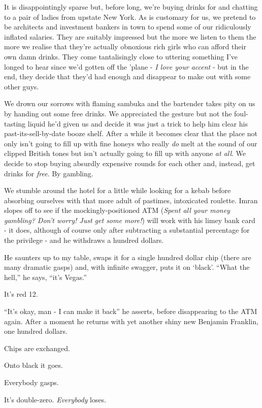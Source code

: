 \documentclass[a5paper,titlepage,11pt,draft]{book}
\begin{document}
It is disappointingly sparse but, before long, we're buying drinks for and chatting to a pair of ladies from upstate New York.  As is customary for us, we pretend to be architects and investment bankers in town to spend some of our ridiculously inflated salaries.  They are suitably impressed but the more we listen to them the more we realise that they're actually obnoxious rich girls who can afford their own damn drinks.  They come tantalisingly close to uttering something I've longed to hear since we'd gotten off the 'plane - \emph{I love your accent} - but in the end, they decide that they'd had enough and disappear to make out with some other guys.

We drown our sorrows with flaming sambuka and the bartender takes pity on us by handing out some free drinks.  We appreciated the gesture but not the foul-tasting liquid he'd given us and decide it was just a trick to help him clear his past-its-sell-by-date booze shelf.  After a while it becomes clear that the place not only isn't going to fill up with fine honeys who really \emph{do} melt at the sound of our clipped British tones but isn't actually going to fill up with anyone \emph{at all}.  We decide to stop buying absurdly expensive rounds for each other and, instead, get drinks for \emph{free}.  By gambling.

We stumble around the hotel for a little while looking for a kebab before absorbing ourselves with that more adult of pastimes, intoxicated roulette.  Imran slopes off to see if the mockingly-positioned ATM (\emph{Spent all your money gambling?  Don't worry!  Just get some more!}) will work with his limey bank card - it does, although of course only after subtracting a substantial percentage for the privilege - and he withdraws a hundred dollars.

He saunters up to my table, swaps it for a single hundred dollar chip (there are many dramatic gasps) and, with infinite swagger, puts it on `black'.  ``What the hell,'' he says, ``it's Vegas.''

It's red 12.

``It's okay, man - I can make it back'' he asserts, before disappearing to the ATM again.  After a moment he returns with yet another shiny new Benjamin Franklin, one hundred dollars.

Chips are exchanged.

Onto black it goes.

Everybody gasps.

It's double-zero.  \emph{Everybody} loses.
\end{document}
